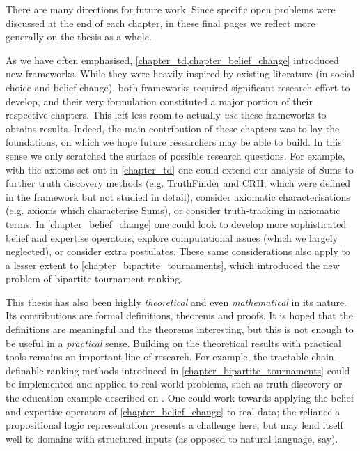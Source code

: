 There are many directions for future work. Since specific open problems were
discussed at the end of each chapter, in these final pages we reflect more
generally on the thesis as a whole.

As we have often emphasised, \cref{chapter_td,chapter_belief_change} introduced
new frameworks. While they were heavily inspired by existing literature (in
social choice and belief change), both frameworks required significant research
effort to develop, and their very formulation constituted a major portion of
their respective chapters. This left less room to actually \emph{use} these
frameworks to obtains results. Indeed, the main contribution of these chapters
was to lay the foundations, on which we hope future researchers may be able to
build. In this sense we only scratched the surface of possible research
questions.
%
For example, with the axioms set out in \cref{chapter_td} one could extend our
analysis of Sums to further truth discovery methods (e.g. TruthFinder and CRH,
which were defined in the framework but not studied in detail), consider
axiomatic characterisations (e.g. axioms which characterise Sums), or consider
truth-tracking in axiomatic terms. In \cref{chapter_belief_change} one could
look to develop more sophisticated belief and expertise operators, explore
computational issues (which we largely neglected), or consider extra
postulates. These same considerations also apply to a lesser extent to
\cref{chapter_bipartite_tournaments}, which introduced the new problem of
bipartite tournament ranking.

This thesis has also been highly \emph{theoretical} and even
\emph{mathematical} in its nature. Its contributions are formal definitions,
theorems and proofs. It is hoped that the definitions are meaningful and the
theorems interesting, but this is not enough to be useful in a \emph{practical}
sense. Building on the theoretical results with practical tools remains an
important line of research. For example, the tractable chain-definable ranking
methods introduced in \cref{chapter_bipartite_tournaments} could be implemented
and applied to real-world problems, such as truth discovery or the education
example described on . One could work towards
applying the belief and expertise operators of \cref{chapter_belief_change} to
real data; the reliance a propositional logic representation presents a
challenge here, but may lend itself well to domains with structured inputs (as
opposed to natural language, say).
